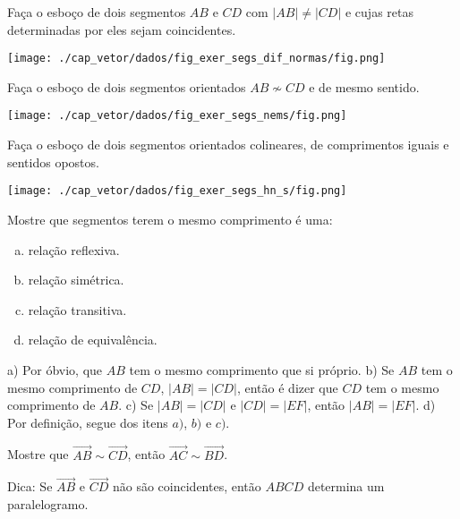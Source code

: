 \begin{exer}\label{cap_vetor_sec_segorien:fig:exer_segs_dif_normas}
  Faça o esboço de dois segmentos $AB$ e $CD$ com $|AB|\neq |CD|$ e cujas retas determinadas por eles sejam coincidentes.
\end{exer}
\begin{resp}

  \texttt{[image: ./cap\_vetor/dados/fig\_exer\_segs\_dif\_normas/fig.png]}
\end{resp}

\begin{exer}\label{cap_vetor_sec_segorien:fig:exer_segs_nems}
  Faça o esboço de dois segmentos orientados $AB\not\sim CD$ e de mesmo sentido.
\end{exer}
\begin{resp}
  
  \texttt{[image: ./cap\_vetor/dados/fig\_exer\_segs\_nems/fig.png]}
\end{resp}

\begin{exer}\label{cap_vetor_sec_segorien:fig:exer_segs_hn_s}
  Faça o esboço de dois segmentos orientados colineares, de comprimentos iguais e sentidos opostos.
\end{exer}
\begin{resp}
  
  \texttt{[image: ./cap\_vetor/dados/fig\_exer\_segs\_hn\_s/fig.png]}
\end{resp}

\begin{exer}
  Mostre que segmentos terem o mesmo comprimento é uma:
  \begin{enumerate}[a)]
    \item relação reflexiva.
    \item relação simétrica.
    \item relação transitiva.
    \item relação de equivalência.
  \end{enumerate}
\end{exer}
\begin{resp}
  a) Por óbvio, que $AB$ tem o mesmo comprimento que si próprio. b) Se $AB$ tem o mesmo comprimento de $CD$, $|AB| = |CD|$, então é dizer que $CD$ tem o mesmo comprimento de $AB$. c) Se $|AB| = |CD|$ e $|CD| = |EF|$, então $|AB| = |EF|$. d) Por definição, segue dos itens $a)$, $b)$ e $c)$.
\end{resp}

\begin{exer}
  Mostre que $\overrightarrow{AB}\sim \overrightarrow{CD}$, então $\overrightarrow{AC}\sim \overrightarrow{BD}$.
\end{exer}
\begin{resp}
  Dica: Se $\overrightarrow{AB}$ e $\overrightarrow{CD}$ não são coincidentes, então $ABCD$ determina um paralelogramo.
\end{resp}

